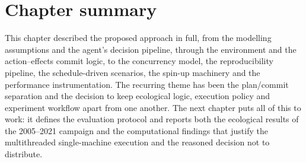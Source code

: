 \section{Chapter summary}

This chapter described the proposed approach in full, from the modelling assumptions and the agent's decision pipeline, through the environment and the action--effects commit logic, to the concurrency model, the reproducibility pipeline, the schedule-driven scenarios, the spin-up machinery and the performance instrumentation. The recurring theme has been the plan/commit separation and the decision to keep ecological logic, execution policy and experiment workflow apart from one another. The next chapter puts all of this to work: it defines the evaluation protocol and reports both the ecological results of the 2005--2021 campaign and the computational findings that justify the multithreaded single-machine execution and the reasoned decision not to distribute.
